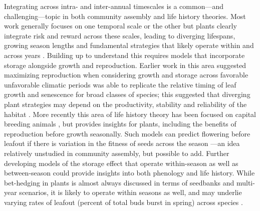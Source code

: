 \documentclass[11pt]{article}
\begin{document}
Integrating across intra- and inter-annual timescales is a common---and challenging---topic in both community assembly and life history theories. Most work generally focuses on one temporal scale or the other but plants clearly integrate risk and reward across these scales, leading to diverging lifespans, growing season lengths and fundamental strategies that likely operate within and across years \citep{bazzaz1987allocating}. Building up to understand this requires models that incorporate storage alongside growth and reproduction. Earlier work in this area suggested maximizing reproduction when considering growth and storage across favorable unfavorable climatic periods was able to replicate the relative timing of leaf growth and senescence for broad classes of species; this suggested that diverging plant strategies may depend on the productivity, stability and reliability of the habitat \citep{iwasa1989optimal}. More recently this area of life history theory has been focused on capital breeding animals \citep[e.g.,][]{varpe2009adaptive}, but provides insights for plants, including the benefits of reproduction before growth seasonally. Such models can predict flowering before leafout if there is variation in the fitness of seeds across the season \citep{ejsmond2010time}---an idea relatively unstudied in community assembly, but possible to add. Further developing models of the storage effect that operate within-season as well as between-season could provide insights into both phenology and life history. While bet-hedging in plants is almost always discussed in terms of seedbanks and multi-year scenarios, it is likely to operate within seasons as well, and may underlie varying rates of leafout (percent of total buds burst in spring) across species \citep{baumgarten2021chilled}. 
\end{document}

